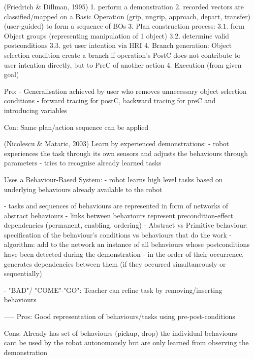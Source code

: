 (Friedrich \& Dillman, 1995)
1. perform a demonstration
2. recorded vectors are classified/mapped on a Basic Operation (grip, ungrip, approach, depart, transfer) (user-guided) to form a sequence of BOs
3. Plan construction process: 
3.1. form Object groups (representing manipulation of 1 object)
3.2. determine valid postconditions
3.3. get user intention via HRI
4. Branch generation: Object selection condition
create a branch if operation's PostC does not contribute to user intention directly, but to PreC of another action
4. Execution (from given goal)

Pro:
- Generalisation achieved by user who removes unnecessary object selection conditions
- forward tracing for postC, backward tracing for preC and introducing variables

Con:
Same plan/action sequence can be applied

(Nicolescu \& Mataric, 2003)
Learn by experienced demonstrations:
- robot experiences the task through its own sensors and adjusts the behaviours through parameters
- tries to recognise already learned tasks

Uses a Behaviour-Based System:
- robot learns high level tasks based on underlying behaviours already available to the robot

- tasks and sequences of behaviours are represented in form of networks of abstract behaviours
- links between behaviours represent precondition-effect dependencies (permanent, enabling, ordering)
- Abstract vs Primitive behaviour: specification of the behaviour's conditions vs behaviours that do the work
- algorithm: add to the network an instance of all behaviours whose postconditions have been detected during the demonstration - in the order of their occurrence, generates dependencies between them (if they occurred simultaneously or sequentially)

- "BAD"/ "COME"-"GO": Teacher can refine task by removing/inserting behaviours

-----
Pros:
Good representation of behaviours/tasks using pre-post-conditions

Cons:
Already has set of behaviours (pickup, drop)
the individual behaviours cant be used by the robot autonomously but are only learned from observing the demonstration

